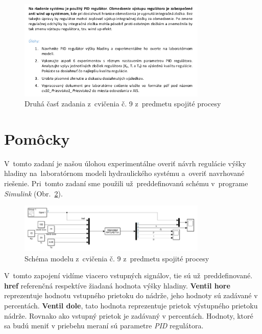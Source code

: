 \documentclass{article}
\begin{document}
\begin{figure}[!htbp]
	\begin{center}
		\includegraphics[width=0.8\textwidth]{./include/zadaniep2.png}
	\end{center}
	\caption{Druhá časť zadania z~cvičenia č. 9 z~predmetu spojité procesy}
		\label{fig:zadanie2}
\end{figure}

\clearpage

\section{Pomôcky}
\label{sec:pomocky}

V~tomto zadaní je našou úlohou experimentálne overiť návrh regulácie výšky hladiny na~laboratórnom
modeli hydraulického systému a~overiť navrhované riešenie. Pri~tomto zadaní sme použili už~preddefinovanú schému
v~programe \textit{Simulink} (Obr.~\ref{fig:schema}).

\begin{figure}[!htbp]
	\begin{center}
		\includegraphics[width=0.8\textwidth]{./include/schema.png}
	\end{center}
	\caption{Schéma modelu z~cvičenia č. 9 z~predmetu spojité procesy}
	\label{fig:schema}
\end{figure}

V~tomto zapojení vidíme viacero vstupných signálov, tie sú už~preddefinované. \textbf{href} referenčná respektíve
žiadaná hodnota výšky hladiny. \textbf{Ventil hore} reprezentuje hodnotu vstupného prietoku do nádrže, jeho hodnoty
sú zadávané v percentách. \textbf{Ventil dole}, tato hodnota reprezentuje prietok výstupného prietoku nádrže.
Rovnako ako vstupný prietok je zadávaný v percentách. Hodnoty, ktoré sa budú meniť v priebehu meraní sú parametre
\textit{PID} regulátora.
\end{document}

